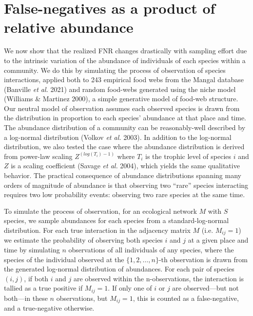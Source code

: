 \documentclass[11pt]{article}
\begin{document}
\hypertarget{false-negatives-as-a-product-of-relative-abundance}{%
\section{False-negatives as a product of relative
abundance}\label{false-negatives-as-a-product-of-relative-abundance}}

We now show that the realized FNR changes drastically with sampling
effort due to the intrinsic variation of the abundance of individuals of
each species within a community. We do this by simulating the process of
observation of species interactions, applied both to 243 empirical food
webs from the Mangal database (Banville \emph{et al.} 2021) and random
food-webs generated using the niche model (Williams \& Martinez 2000), a
simple generative model of food-web structure. Our neutral model of
observation assumes each observed species is drawn from the distribution
in proportion to each species' abundance at that place and time. The
abundance distribution of a community can be reasonably-well described
by a log-normal distribution (Volkov \emph{et al.} 2003). In addition to
the log-normal distribution, we also tested the case where the abundance
distribution is derived from power-law scaling \(Z^{(log(T_i)-1)}\)
where \(T_i\) is the trophic level of species \(i\) and \(Z\) is a
scaling coefficient (Savage \emph{et al.} 2004), which yields the same
qualitative behavior. The practical consequence of abundance
distributions spanning many orders of magnitude of abundance is that
observing two ``rare'' species interacting requires two low probability
events: observing two rare species at the same time.

To simulate the process of observation, for an ecological network \(M\)
with \(S\) species, we sample abundances for each species from a
standard-log-normal distribution. For each true interaction in the
adjacency matrix \(M\) (i.e. \(M_{ij}=1\)) we estimate the probability
of observing both species \(i\) and \(j\) at a given place and time by
simulating \(n\) observations of all individuals of any species, where
the species of the individual observed at the \(\{1,2,\dots,n\}\)-th
observation is drawn from the generated log-normal distribution of
abundances. For each pair of species \((i,j)\), if both \(i\) and \(j\)
are observed within the n-observations, the interaction is tallied as a
true positive if \(M_{ij}=1\). If only one of \(i\) or \(j\) are
observed---but not both---in these \(n\) observations, but \(M_{ij}=1\),
this is counted as a false-negative, and a true-negative otherwise.
\end{document}

